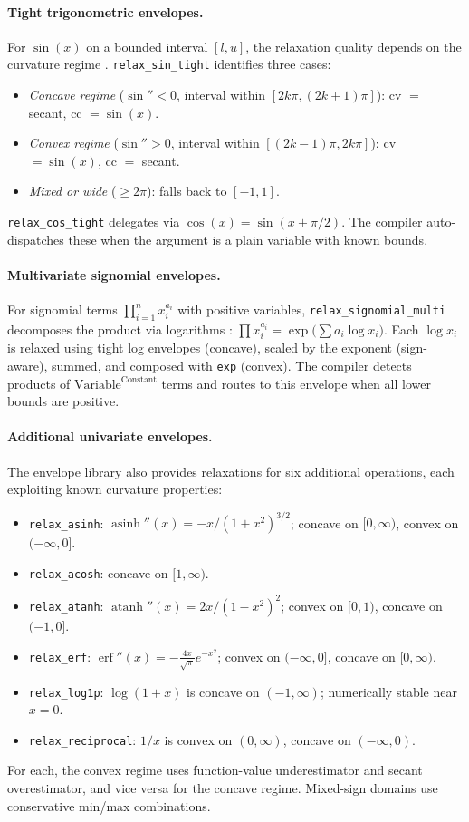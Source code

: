 \documentclass[12pt,preprint]{article}
\begin{document}
\paragraph{Tight trigonometric envelopes.}
For $\sin(x)$ on a bounded interval $[l, u]$, the relaxation quality depends on the curvature regime \cite{Locatelli2014}. \texttt{relax\_sin\_tight} identifies three cases:
\begin{itemize}
\item \emph{Concave regime} ($\sin'' < 0$, interval within $[2k\pi, (2k+1)\pi]$): cv $=$ secant, cc $= \sin(x)$.
\item \emph{Convex regime} ($\sin'' > 0$, interval within $[(2k-1)\pi, 2k\pi]$): cv $= \sin(x)$, cc $=$ secant.
\item \emph{Mixed or wide} ($\ge 2\pi$): falls back to $[-1, 1]$.
\end{itemize}
\texttt{relax\_cos\_tight} delegates via $\cos(x) = \sin(x + \pi/2)$. The compiler auto-dispatches these when the argument is a plain variable with known bounds.

\paragraph{Multivariate signomial envelopes.}
For signomial terms $\prod_{i=1}^n x_i^{a_i}$ with positive variables, \texttt{relax\_signomial\_multi} decomposes the product via logarithms \cite{Maranas1997}:
$\prod x_i^{a_i} = \exp\!\bigl(\sum a_i \log x_i\bigr)$.
Each $\log x_i$ is relaxed using tight log envelopes (concave), scaled by the exponent (sign-aware), summed, and composed with \texttt{exp} (convex). The compiler detects products of $\text{Variable}^{\text{Constant}}$ terms and routes to this envelope when all lower bounds are positive.

\paragraph{Additional univariate envelopes.}
The envelope library also provides relaxations for six additional operations, each exploiting known curvature properties:
\begin{itemize}
\item \texttt{relax\_asinh}: $\operatorname{asinh}''(x) = -x/(1+x^2)^{3/2}$; concave on $[0,\infty)$, convex on $(-\infty,0]$.
\item \texttt{relax\_acosh}: concave on $[1,\infty)$.
\item \texttt{relax\_atanh}: $\operatorname{atanh}''(x) = 2x/(1-x^2)^2$; convex on $[0,1)$, concave on $(-1,0]$.
\item \texttt{relax\_erf}: $\operatorname{erf}''(x) = -\frac{4x}{\sqrt{\pi}} e^{-x^2}$; convex on $(-\infty,0]$, concave on $[0,\infty)$.
\item \texttt{relax\_log1p}: $\log(1+x)$ is concave on $(-1,\infty)$; numerically stable near $x=0$.
\item \texttt{relax\_reciprocal}: $1/x$ is convex on $(0,\infty)$, concave on $(-\infty,0)$.
\end{itemize}
For each, the convex regime uses function-value underestimator and secant overestimator, and vice versa for the concave regime. Mixed-sign domains use conservative min/max combinations.
\end{document}
